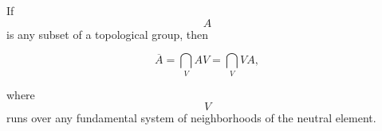 If $$A$$ is any subset of a topological group, then

$$\overline{A} = \bigcap_V AV = \bigcap_V VA,$$

where $$V$$ runs over any fundamental system of neighborhoods of the neutral element.
